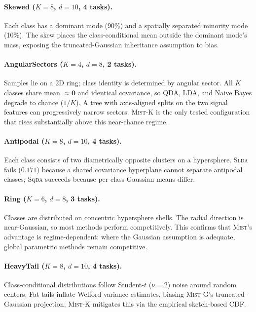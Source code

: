 \documentclass{article}
\newcommand{\mist}{\textsc{Mist}}
\newcommand{\slda}{\textsc{Slda}}
\newcommand{\sqda}{\textsc{Sqda}}
\begin{document}
\paragraph{Skewed ($K{=}8$, $d{=}10$, 4 tasks).}
Each class has a dominant mode (90\%) and a spatially separated minority
mode (10\%). The skew places the class-conditional mean outside the dominant
mode's mass, exposing the truncated-Gaussian inheritance assumption to bias.

\paragraph{AngularSectors ($K{=}4$, $d{=}8$, 2 tasks).}
Samples lie on a 2D ring; class identity is determined by angular sector.
All $K$ classes share mean $\approx\mathbf{0}$ and identical covariance, so
QDA, LDA, and Naive Bayes degrade to chance ($1/K$). A tree with
axis-aligned splits on the two signal features can progressively narrow
sectors. \mist{}-K is the only tested configuration that rises substantially
above this near-chance regime.

\paragraph{Antipodal ($K{=}8$, $d{=}10$, 4 tasks).}
Each class consists of two diametrically opposite clusters on a
hypersphere. \slda{} fails ($0.171$) because a shared covariance hyperplane
cannot separate antipodal classes; \sqda{} succeeds because per-class
Gaussian means differ.

\paragraph{Ring ($K{=}6$, $d{=}8$, 3 tasks).}
Classes are distributed on concentric hypersphere shells. The radial
direction is near-Gaussian, so most methods perform competitively. This
confirms that \mist{}'s advantage is regime-dependent: where the Gaussian
assumption is adequate, global parametric methods remain competitive.

\paragraph{HeavyTail ($K{=}8$, $d{=}10$, 4 tasks).}
Class-conditional distributions follow Student-$t$ ($\nu{=}2$) noise around
random centers. Fat tails inflate Welford variance estimates, biasing
\mist{}-G's truncated-Gaussian projection; \mist{}-K mitigates this via the
empirical sketch-based CDF.
\end{document}
